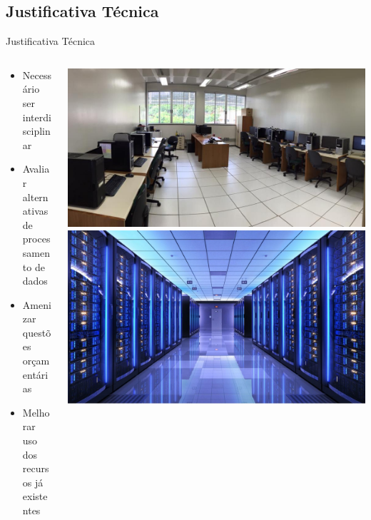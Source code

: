 \documentclass[10pt,brazil]{beamer}
\theoremstyle{definition}
\begin{document}
\subsection{Justificativa Técnica}

\begin{frame}{Justificativa Técnica}
  \begin{columns}
    \begin{column}{0.5\textwidth}
      \begin{itemize}
            \item Necessário ser interdisciplinar
            \item Avaliar alternativas de processamento de dados 
            \item Amenizar questões orçamentárias
            \item Melhorar uso dos recursos já existentes
      \end{itemize}
  \end{column}
    \begin{column}{0.5\textwidth}  %
      \begin{center}
        \includegraphics[width=1\textwidth]{lab.jpg}        
        \includegraphics[width=1\textwidth]{hpc.jpeg}        
      \end{center}
    \end{column}
  \end{columns}
\end{frame}
\end{document}
